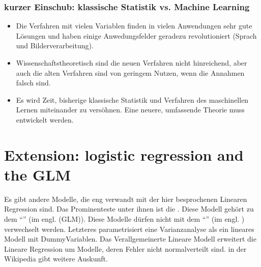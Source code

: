 \documentclass[letterpaper,10pt,english]{jupyterBook}
\begin{document}
\subsection{kurzer Einschub: klassische Statistik vs. Machine Learning}
\label{\detokenize{Regression_Techniques:id1}}\begin{itemize}
\item {} 
\sphinxAtStartPar
Die Verfahren mit vielen Variablen finden in vielen Anwendungen sehr gute Lösungen und haben einige Anwedungsfelder geradezu revolutioniert (Sprach\sphinxhyphen{} und Bilderverarbeitung).

\item {} 
\sphinxAtStartPar
Wissenschaftstheoretisch sind die neuen Verfahren nicht hinreichend, aber auch die alten Verfahren sind von geringem Nutzen, wenn die Annahmen falsch sind.

\item {} 
\sphinxAtStartPar
Es wird Zeit, bisherige klassische Statistik und Verfahren des maschinellen Lernen miteinander zu versöhnen. Eine neuere, umfassende Theorie muss entwickelt werden.

\end{itemize}

\noindent{}


\chapter{Extension: logistic regression and the GLM}
\label{\detokenize{Regression_Techniques:extension-logistic-regression-and-the-glm}}
\sphinxAtStartPar
Es gibt andere Modelle, die eng verwandt mit der hier besprochenen Linearen Regression sind. Das Prominenteste unter ihnen ist die . Diese Modell gehört zu dem “” (im engl.  (GLM)). Diese Modelle dürfen nicht mit dem “” (im engl. ) verwechselt werden. Letzteres parametrisiert eine Varianzanalyse als ein lineares Modell mit Dummy\sphinxhyphen{}Variablen.
Das Verallgemeinerte Lineare Modell erweitert die Lineare Regression um Modelle, deren Fehler nicht normalverteilt sind.
 in der Wikipedia gibt weitere Auskunft.
\end{document}
